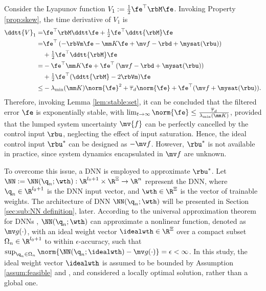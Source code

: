 \documentclass[journal]{IEEEtran}
\begin{document}
Consider the Lyapunov function $V_1:= \tfrac{1}{2}\fe^\top \rbM\fe$. 
Invoking Property \ref{prop:skew}, the time derivative of $V_1$ is
\begin{equation}
    \begin{aligned}
        \ddtt{V}_1
        =&
        \fe^\top \rbM \ddtt \fe
        +
        \tfrac{1}{2}\fe^\top \ddtt{\rbM}\fe
        \\
        =&
        \fe^\top 
        \left(
            -\rbVm \fe -\mm K \fe + \mv f
            -\rbd + \mysat(\rbu)
        \right)
        \\
        &
        +
        \tfrac{1}{2}
        \fe^\top \ddtt{\rbM}\fe
        \\
        =&
        -
        \fe^\top \mm K \fe 
        +
        \fe^\top 
        \left(
            \mv f
            -\rbd
            +\mysat(\rbu)
        \right)
        \\
        &
        +
        \tfrac{1}{2}
        \fe^\top(\ddtt{\rbM}- 2\rbVm)\fe
        \\
        \le&
        -\lambda_{\min}(\mm K)\norm{\fe}^2
        +
        \overline\tau_d\norm{\fe}
        +
        \fe^\top (\mv f+\mysat(\rbu))
        .
    \end{aligned}
    \label{eq:lya1:dot1}
\end{equation} 
Therefore, invoking Lemma \ref{lem:stable:set}, it can be concluded that the filtered error $\fe$ is exponentially stable, with $\lim_{t\to\infty}\norm{\fe}\le\tfrac{\overline\tau_d}{\lambda_{\min}(\mm K)}$, provided that the lumped system uncertainty $\mv{f}$ can be perfectly cancelled by the control input $\rbu$, neglecting the effect of input saturation.
Hence, the ideal control input $\rbu^*$ can be designed as $-\mv f$.
However, $\rbu^*$ is not available in practice, since system dynamics encapsulated in $\mv f$ are unknown.

To overcome this issue, a DNN is employed to approximate $\rbu^*$.
Let $\NN:=\NN({\q}_n;\wth): \R^{l_0+1}\times\R^{\Xi}\to\R^{n}$ represent the DNN, where ${\q}_n\in\R^{l_0+1}$ is the DNN input vector, and $\wth\in\R^{\Xi}$ is the vector of trainable weights.
The architecture of DNN $\NN({\q}_n;\wth)$ will be presented in Section \ref{sec:sub:NN definition}, later.
According to the universal approximation theorem for DNNs \cite{Kidger:2020aa}, $\NN({\q}_n;\wth)$ can approximate a nonlinear function, denoted as $\mv g(\cdot)$, with an ideal weight vector $\idealwth\in\R^\Xi$ over a compact subset $\Omega_{n}\in\R^{l_0+1}$ to within $\epsilon$-accuracy, such that $\sup_{{\q}_n\in\Omega_{n}}\norm{ \NN({\q}_n;\idealwth) - \mv g(\cdot)} = \epsilon < \infty$.
In this study, the ideal weight vector $\idealwth$ is assumed to be bounded by Assumption \ref{assum:feasible} and \cite[Assum. 1]{Lewis:1996aa}, and considered a locally optimal solution, rather than a global one.
\end{document}

